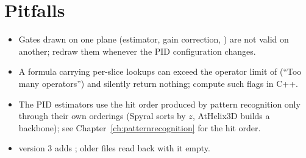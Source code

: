 \section{Pitfalls}

\begin{itemize}
\item Gates drawn on one plane (estimator, gain correction, ) are not valid on another; redraw
  them whenever the PID configuration changes.
\item A  formula carrying per-slice lookups can exceed the operator limit of 
  (``Too many operators'') and silently return nothing; compute such flags in C++.
\item The PID estimators use the hit order produced by pattern recognition only through their own orderings
  (Spyral sorts by $z$, AtHelix3D builds a backbone); see Chapter~\ref{ch:patternrecognition} for the hit order.
\item {} version 3 adds ; older files read back with it empty.
\end{itemize}
